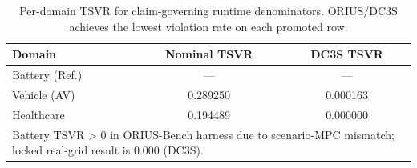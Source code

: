 \begin{table}[htbp]
\centering\small
\caption{Per-domain TSVR for claim-governing runtime denominators. ORIUS/DC3S achieves the lowest violation rate on each promoted row.}
\label{tab:per_domain_controller_comparison}
\begin{tabular}{lcc}
\toprule
\textbf{Domain} & \textbf{Nominal TSVR} & \textbf{DC3S TSVR} \\
\midrule
Battery (Ref.) & --- & --- \\
Vehicle (AV) & 0.289250 & 0.000163 \\
Healthcare & 0.194489 & 0.000000 \\
\bottomrule
\multicolumn{3}{l}{\small Battery TSVR > 0 in ORIUS-Bench harness due to scenario-MPC mismatch; locked real-grid result is 0.000 (DC3S).}\\
\end{tabular}
\end{table}
